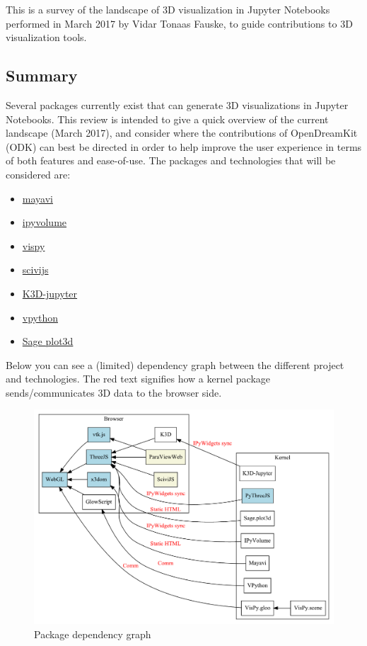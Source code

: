This is a survey of the landscape of 3D visualization in Jupyter Notebooks
performed in March 2017 by Vidar Tonaas Fauske,
to guide \ODK contributions to 3D visualization tools.

\subsection{Summary}

Several packages currently exist that can generate 3D visualizations in
Jupyter Notebooks. This review is intended to give a quick overview of
the current landscape (March 2017), and consider where the contributions
of OpenDreamKit (ODK) can best be directed in order to help improve the
user experience in terms of both features and ease-of-use. The packages
and technologies that will be considered are:

\begin{itemize}
\tightlist
\item
  \href{http://docs.enthought.com/mayavi/mayavi/tips.html\#using-mayavi-in-jupyter-notebooks}{mayavi}
\item
  \href{https://github.com/maartenbreddels/ipyvolume}{ipyvolume}
\item
  \href{http://vispy.org}{vispy}
\item
  \href{https://www.logilab.org/blogentry/8541176}{scivijs}
\item
  \href{https://github.com/K3D-tools/K3D-jupyter}{K3D-jupyter}
\item
  \href{http://vpython.org}{vpython}
\item
  \href{http://nbviewer.jupyter.org/github/sagemanifolds/SageManifolds/blob/master/Worksheets/v1.0/SM_sphere_S2.ipynb}{Sage
  plot3d}
\end{itemize}

Below you can see a (limited) dependency graph between the different
project and technologies. The red text signifies how a kernel package
sends/communicates 3D data to the browser side.

\begin{figure}
\label{fig:pdep}
\centering
\includegraphics[width=0.6\paperwidth]{existing_tools/dependencies.pdf}
\caption{Package dependency graph}
\end{figure}

